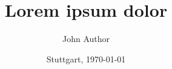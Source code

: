\documentclass[10pt,compress]{beamer}
\title{Lorem ipsum dolor}
\author{John Author}
\institute[]{%
  Author Street 12\\
  D-71686 Remseck\\
  john@author.org 
  }
\date{Stuttgart, \today}
\begin{document}
\frame{\titlepage}




\end{document}
